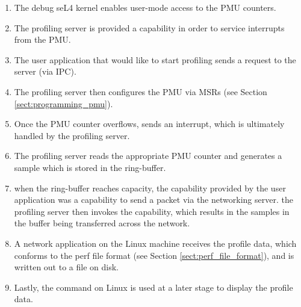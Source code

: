 \ssp\begin{enumerate}
    \item The debug seL4 kernel enables user-mode access to the PMU counters.
    \item The profiling server is provided a capability in order to service interrupts from the PMU.
    \item The user application that would like to start profiling sends a request to the server (via IPC).
    \item The profiling server then configures the PMU via MSRs (see Section \ref{sect:programming_pmu}).
    \item Once the PMU counter overflows, sends an interrupt, which is ultimately handled by the profiling server.
    \item The profiling server reads the appropriate PMU counter and generates a sample which is stored in the ring-buffer.
    \item when the ring-buffer reaches capacity, the capability provided by the user application was a capability to send a packet via the networking server. the profiling server then invokes the capability, which results in the samples in the buffer being transferred across the network.
    \item A network application on the Linux machine receives the profile data, which conforms to the perf file format (see Section \ref{sect:perf_file_format}), and is written out to a file on disk.
    \item Lastly, the  command on Linux is used at a later stage to display the profile data.
\end{enumerate}\dsp